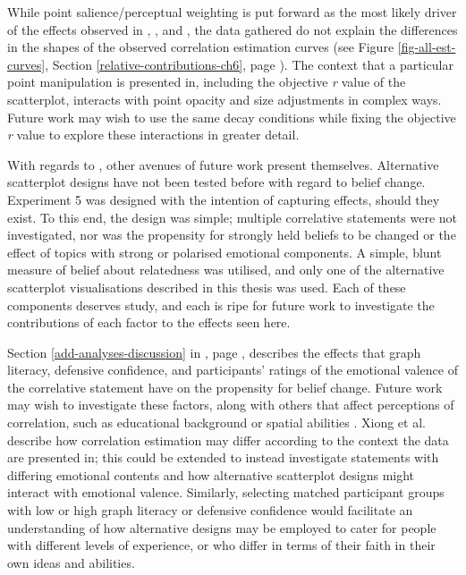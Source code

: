 \documentclass[../main.tex]{subfiles}
\begin{document}
While point salience/perceptual weighting is put forward as the most
likely driver of the effects observed in ,
, and ,
the data gathered do not explain the differences in the shapes of the
observed correlation estimation curves (see Figure
\ref{fig-all-est-curves}, Section \ref{relative-contributions-ch6}, page
\pageref{fig-all-est-curves}). The context that a particular point
manipulation is presented in, including the objective \emph{r} value of
the scatterplot, interacts with point opacity and size adjustments in
complex ways. Future work may wish to use the same decay conditions
while fixing the objective \emph{r} value to explore these interactions
in greater detail.

With regards to , other avenues of future work
present themselves. Alternative scatterplot designs have not been tested
before with regard to belief change. Experiment 5 was designed with the
intention of capturing effects, should they exist. To this end, the
design was simple; multiple correlative statements were not
investigated, nor was the propensity for strongly held beliefs to be
changed or the effect of topics with strong or polarised emotional
components. A simple, blunt measure of belief about relatedness was
utilised, and only one of the alternative scatterplot visualisations
described in this thesis was used. Each of these components deserves
study, and each is ripe for future work to investigate the contributions
of each factor to the effects seen here.

Section \ref{add-analyses-discussion} in , page
\pageref{add-analyses-discussion}, describes the effects that graph
literacy, defensive confidence, and participants' ratings of the
emotional valence of the correlative statement have on the propensity
for belief change. Future work may wish to investigate these factors,
along with others that affect perceptions of correlation, such as
educational background or spatial abilities \cite{tandon_2024}. Xiong et
al.~\cite{xiong_2023} describe how correlation estimation may differ
according to the context the data are presented in; this could be
extended to instead investigate statements with differing emotional
contents and how alternative scatterplot designs might interact with
emotional valence. Similarly, selecting matched participant groups with
low or high graph literacy or defensive confidence would facilitate an
understanding of how alternative designs may be employed to cater for
people with different levels of experience, or who differ in terms of
their faith in their own ideas and abilities.
\end{document}
